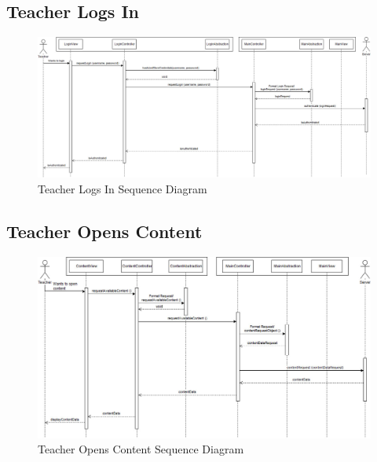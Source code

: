 \documentclass[]{article}
\begin{document}
\subsection{Teacher Logs In}
{
\begin{figure}[H]
  \centering
  \includegraphics[scale=0.3]{A3_Assets/TeacherLogsIn.jpg}
  \caption{Teacher Logs In Sequence Diagram}
\end{figure}
}

\subsection{Teacher Opens Content}
{
\begin{figure}[H]
  \centering
  \includegraphics[scale=0.3]{A3_Assets/TeacherOpensContent.jpg}
  \caption{Teacher Opens Content Sequence Diagram}
\end{figure}
}

\newpage
\end{document}
